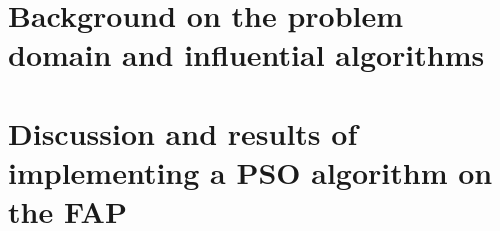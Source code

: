 \documentclass[11pt,a4paper]{book}
\begin{document}
\frontmatter
\makecover
\tableofcontents
\listoffigures
\listofalgorithms
\listoftables
\mainmatter
\part{Background on the problem domain and influential algorithms}
\part{Discussion and results of implementing a PSO algorithm on the FAP}
%
\backmatter
\printglossaries


\end{document}
